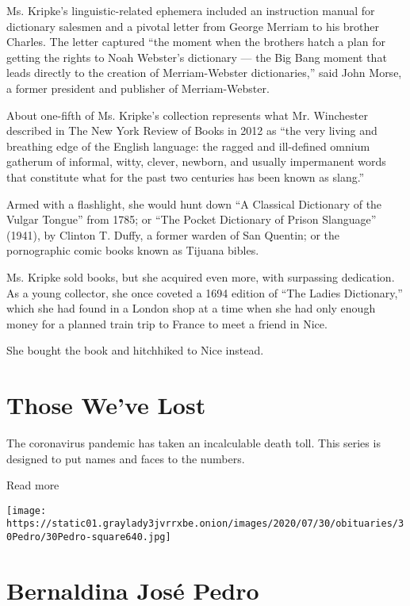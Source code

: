Ms. Kripke's linguistic-related ephemera included an instruction manual
for dictionary salesmen and a pivotal letter from George Merriam to his
brother Charles. The letter captured ``the moment when the brothers
hatch a plan for getting the rights to Noah Webster's dictionary --- the
Big Bang moment that leads directly to the creation of Merriam-Webster
dictionaries,'' said John Morse, a former president and publisher of
Merriam-Webster.

About one-fifth of Ms. Kripke's collection represents what Mr.
Winchester described in The New York Review of Books in 2012 as ``the
very living and breathing edge of the English language: the ragged and
ill-defined omnium gatherum of informal, witty, clever, newborn, and
usually impermanent words that constitute what for the past two
centuries has been known as slang.''

Armed with a flashlight, she would hunt down ``A Classical Dictionary of
the Vulgar Tongue'' from 1785; or ``The Pocket Dictionary of Prison
Slanguage'' (1941), by Clinton T. Duffy, a former warden of San Quentin;
or the pornographic comic books known as Tijuana bibles.

Ms. Kripke sold books, but she acquired even more, with surpassing
dedication. As a young collector, she once coveted a 1694 edition of
``The Ladies Dictionary,'' which she had found in a London shop at a
time when she had only enough money for a planned train trip to France
to meet a friend in Nice.

She bought the book and hitchhiked to Nice instead.

\href{https://www.nytimes3xbfgragh.onion/interactive/2020/obituaries/people-died-coronavirus-obituaries.html?action=click\&pgtype=Article\&state=default\&region=BELOW_MAIN_CONTENT\&context=covid_obits_promo}{}

\hypertarget{those-weve-lost}{%
\section{Those We've Lost}\label{those-weve-lost}}

The coronavirus pandemic has taken an incalculable death toll. This
series is designed to put names and faces to the numbers.

Read more

\texttt{[image: https://static01.graylady3jvrrxbe.onion/images/2020/07/30/obituaries/30Pedro/30Pedro-square640.jpg]}

\hypertarget{bernaldina-josuxe9-pedro}{%
\section{Bernaldina José Pedro}\label{bernaldina-josuxe9-pedro}}

